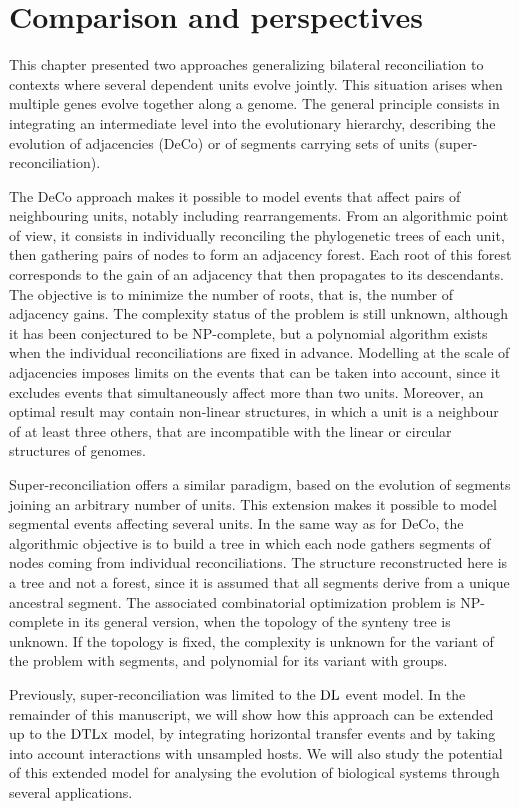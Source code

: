 \section{Comparison and perspectives}

This chapter presented two approaches generalizing bilateral reconciliation to contexts where several dependent units evolve jointly.
This situation arises when multiple genes evolve together along a genome.
The general principle consists in integrating an intermediate level into the evolutionary hierarchy, describing the evolution of adjacencies (DeCo) or of segments carrying sets of units (super-reconciliation).

The DeCo approach makes it possible to model events that affect pairs of neighbouring units, notably including rearrangements.
From an algorithmic point of view, it consists in individually reconciling the phylogenetic trees of each unit, then gathering pairs of nodes to form an adjacency forest.
Each root of this forest corresponds to the gain of an adjacency that then propagates to its descendants.
The objective is to minimize the number of roots, that is, the number of adjacency gains.
The complexity status of the problem is still unknown, although it has been conjectured to be NP-complete, but a polynomial algorithm exists when the individual reconciliations are fixed in advance.
Modelling at the scale of adjacencies imposes limits on the events that can be taken into account, since it excludes events that simultaneously affect more than two units.
Moreover, an optimal result may contain non-linear structures, in which a unit is a neighbour of at least three others, that are incompatible with the linear or circular structures of genomes.

Super-reconciliation offers a similar paradigm, based on the evolution of segments joining an arbitrary number of units.
This extension makes it possible to model segmental events affecting several units.
In the same way as for DeCo, the algorithmic objective is to build a tree in which each node gathers segments of nodes coming from individual reconciliations.
The structure reconstructed here is a tree and not a forest, since it is assumed that all segments derive from a unique ancestral segment.
The associated combinatorial optimization problem is NP-complete in its general version, when the topology of the synteny tree is unknown.
If the topology is fixed, the complexity is unknown for the variant of the problem with segments, and polynomial for its variant with groups.

Previously, super-reconciliation was limited to the \(\mathrm{D}\mathrm{L}\) event model.
In the remainder of this manuscript, we will show how this approach can be extended up to the \(\mathrm{D}\mathrm{T}\mathrm{L}\mathrm{x}\) model, by integrating horizontal transfer events and by taking into account interactions with unsampled hosts.
We will also study the potential of this extended model for analysing the evolution of biological systems through several applications.
